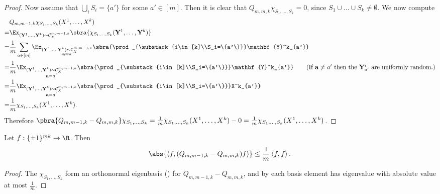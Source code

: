 \begin{proof}
    Now assume that $\bigcup_i S_i=\{a'\}$ for some $a'\in[m]$. Then it is clear that $Q_{m,m,k}\chi_{S_1,\dots,S_k}=0$, since $S_1\cup\dots\cup S_k\neq\emptyset$. We now compute
    \begin{align*}
        &Q_{m,m-1,k}\chi_{S_1,\dots,S_k}(X^1,\dots,X^k)\\
        =&\Ex_{(\mathbf{Y}^1,\dots,\mathbf{Y}^k)\sim\mathcal{C}^{m,m-1,k}_{X}}\sbra{\chi_{S_1,\dots,S_k}(\mathbf{Y}^1,\dots,\mathbf{Y}^k)}\\
        =&\frac1m\sum_{a\in[m]}\Ex_{\substack{(\mathbf{Y}^1,\dots,\mathbf{Y}^k)\sim\mathcal{C}^{m,m-1,k}_{X}\\\mathbf{a}=a}}\sbra{\prod_{\substack{i\in[k]\\S_i=\{a'\}}}\mathbf{Y}^k_{a'}}\\
        =&\frac1m\Ex_{\substack{(\mathbf{Y}^1,\dots,\mathbf{Y}^k)\sim\mathcal{C}^{m,m-1,k}_{X}\\\mathbf{a}=a'}}\sbra{\prod_{\substack{i\in[k]\\S_i=\{a'\}}}\mathbf{Y}^k_{a'}}\tag{If $\mathbf{a}\neq a'$ then the $\mathbf{Y}^i_{a'}$ are uniformly random.}\\
        =&\frac1m\Ex_{\substack{(\mathbf{Y}^1,\dots,\mathbf{Y}^k)\sim\mathcal{C}^{m,m-1,k}_{X}\\\mathbf{a}=a'}}\sbra{\prod_{\substack{i\in[k]\\S_i=\{a'\}}}X^k_{a'}}\\
        =&\frac1m\chi_{S_1,\dots,S_k}(X^1,\dots,X^k).
    \end{align*}
    Therefore $\pbra{Q_{m,m-1,k}-Q_{m,m,k}}\chi_{S_1,\dots,S_k}=\frac1m\chi_{S_1,\dots,S_k}(X^1,\dots,X^k)-0=\frac1m\chi_{S_1,\dots,S_k}(X^1,\dots,X^k)$.
\end{proof}

\begin{corollary}\label{cor:hybrid 2}
    Let $f:\{\pm1\}^{mk}\to\R$. Then
    \begin{align*}
        \abs{\left\langle f,(Q_{m,m-1,k}-Q_{m,m,k})f\right\rangle} \leq \frac1m \left\langle f,f\right\rangle.
    \end{align*}
\end{corollary}
\begin{proof}
    The $\chi_{S_1,\dots,S_k}$ form an orthonormal eigenbasis () for $Q_{m,m-1,k}-Q_{m,m,k}$, and by  each basis element has eigenvalue with absolute value at most $\frac1m$.
\end{proof}

